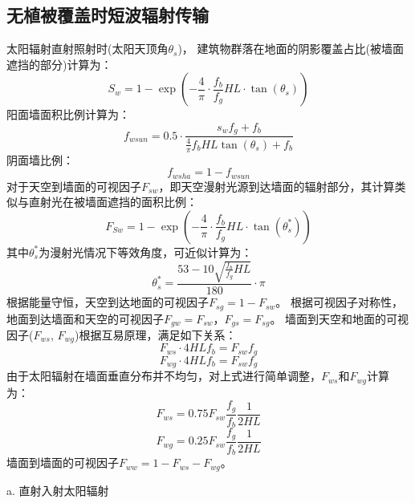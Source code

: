 \subsection{无植被覆盖时短波辐射传输}\label{无植被覆盖时短波辐射传输}
太阳辐射直射照射时(太阳天顶角$\theta_s$)，
建筑物群落在地面的阴影覆盖占比(被墙面遮挡的部分)计算为：
\begin{equation}\label{S_w}
S_{w}=1-\exp \left(-\frac{4}{\pi} \cdot \frac{f_{b}}{f_{g}} {HL} \cdot \tan \left(\theta_{s}\right)\right)
\end{equation}
阳面墙面积比例计算为：
\begin{equation}\label{f_wsun}
f_{wsun}=0.5 \cdot \frac{s_{w} f_{g}+f_{b}}{\frac{4}{\pi} f_{b} {HL} \tan \left(\theta_{s}\right)+f_{b}}
\end{equation}
阴面墙比例：
\begin{equation}\label{f_wsha}
f_{wsha}=1-f_{wsun}
\end{equation}
对于天空到墙面的可视因子$F_{sw}$，即天空漫射光源到达墙面的辐射部分，其计算类似与直射光在被墙面遮挡的面积比例：
\begin{equation}\label{f_Sw}
F_{S w}=1-\exp \left(-\frac{4}{\pi} \cdot \frac{f_{b}}{f_{g}} {HL} \cdot \tan \left(\theta_{s}^{*}\right)\right)
\end{equation}
其中$\theta_s^\ast$为漫射光情况下等效角度，可近似计算为：
\begin{equation}
\theta_{s}^{*}=\frac{53-10 \sqrt{\frac{f_{b}}{f_{g}} {HL}}}{180} \cdot \pi
\end{equation}
根据能量守恒，天空到达地面的可视因子$F_{sg}=1-F_{sw}$。
根据可视因子对称性，地面到达墙面和天空的可视因子$F_{gw}=F_{sw}$，$F_{gs}=F_{sg}$。
墙面到天空和地面的可视因子($F_{ws}$, $F_{wg}$)根据互易原理，满足如下关系：
\begin{equation}
F_{ws} \cdot 4 {HL} f_{b}=F_{s w} f_{g}
\end{equation}
\begin{equation}
F_{w g} \cdot 4 {HL} f_{b}=F_{s w} f_{g}
\end{equation}
由于太阳辐射在墙面垂直分布并不均匀，对上式进行简单调整，$F_{ws}$和$F_{wg}$计算为：
\begin{equation}
F_{ws}=0.75 F_{s w} \frac{f_{g}}{f_{b}} \frac{1}{2 {HL}}
\end{equation}
\begin{equation}
F_{w g}=0.25 F_{s w} \frac{f_{g}}{f_{b}} \frac{1}{2 {HL}}
\end{equation}
墙面到墙面的可视因子$F_{ww}=1-F_{ws}-F_{wg}$。

a. 直射入射太阳辐射

